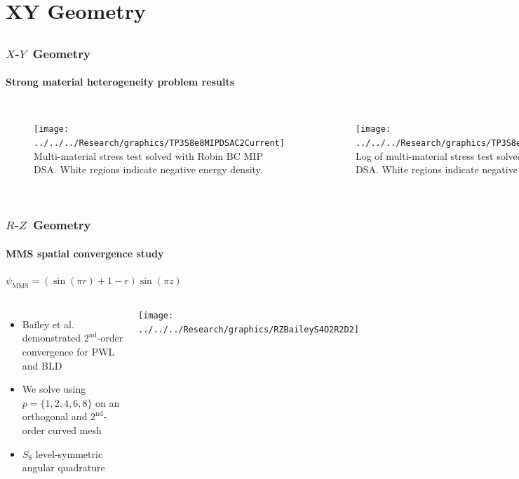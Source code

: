 \documentclass[compress,t]{beamer}
\newcommand{\RZ}{$R$-$Z$}
\newcommand{\XY}{$X$-$Y$}
\begin{document}
\section{XY Geometry}
\subsection{}

\begin{frame}
\frametitle{\XY\ Geometry}
\framesubtitle{Strong material heterogeneity problem results}

\begin{columns}[T]
\begin{figure}[!h]
\centering
\texttt{[image: ../../../Research/graphics/TP3S8e8MIPDSAC2Current]}
\flushleft\tiny{Multi-material stress test solved with Robin BC MIP DSA. White regions indicate negative energy density.}
\label{fig:TP3DSA}
\end{figure}

\begin{figure}[!h]
\centering
\texttt{[image: ../../../Research/graphics/TP3S8e8MIPDSAC2CurrentLog]}
\flushleft\tiny{Log of multi-material stress test solved with Robin BC MIP DSA. White regions indicate negative energy density.}
\label{fig:TP3DSAlog}
\end{figure}
\end{columns}

\end{frame}

\subsection{}
\begin{frame}
\frametitle{\RZ\ Geometry}
\framesubtitle{MMS spatial convergence study}

{\small
$\psi_\text{MMS} = (\sin(\pi r)+1-r) \sin(\pi z)$}

\begin{columns}[T]

\begin{itemize}
\item{Bailey et al. demonstrated $2^\text{nd}$-order convergence for PWL and BLD}
\item{We solve using $p=\{1,2,4,6,8\}$ on an orthogonal and $2^\text{nd}$-order curved mesh}
\item{$S_8$ level-symmetric angular quadrature}
\end{itemize}

\texttt{[image: ../../../Research/graphics/RZBaileyS4O2R2D2]}

\end{columns}

\end{frame}
\end{document}

